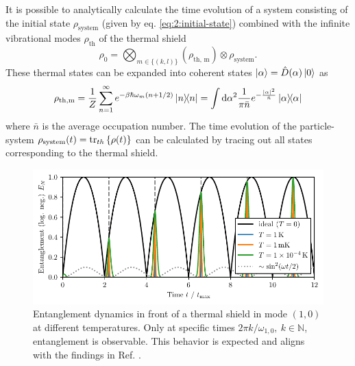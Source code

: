 It is possible to analytically calculate the time evolution of a system consisting of the initial state $\rho_\mathrm{system}$ (given by eq. \eqref{eq:2:initial-state}) combined with the infinite vibrational modes $\rho_\mathrm{th}$ of the thermal shield
\begin{equation}
  \rho_0 = \bigotimes_{m\in\{(k,l)\}} \left(\rho_\mathrm{th,\,m}\right) \otimes \rho_\mathrm{system} .
\end{equation}
These thermal states can be expanded into coherent states $\ket{\alpha} = \hat{D}(\alpha)\ket{0}$ as \cite{Steiner_2024}
\begin{equation}
  \rho_\mathrm{th,m} = \frac{1}{Z} \sum_{n=1}^{\infty} e^{-\beta \hbar \omega_m (n + 1/2)} \ketbra{n} = \int \dd \alpha^2 \frac{1}{\pi \bar{n}} e^{-\frac{\left\lvert\alpha\right\rvert^2}{\bar{n}}} \ketbra{\alpha}
\end{equation}
where $\bar{n}$ is the average occupation number. The time evolution of the particle-system $\rho_\mathrm{system}(t) = \tr_{th}\left\{\rho(t)\right\}$ can be calculated by tracing out all states corresponding to the thermal shield.

\begin{figure}[!htbp]
  \centering
  \includegraphics[width=\textwidth]{./../figures/vibrations/entanglement-hamiltonian.pdf}
  \caption{Entanglement dynamics in front of a thermal shield in mode $(1,0)$ at different temperatures. Only at specific times $2\pi k / \omega_{1,0},\ k\in\mathbb{N}$, entanglement is observable. This behavior is expected and aligns with the findings in Ref. \cite{Pedernales_2022}.}
\end{figure}

